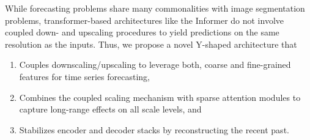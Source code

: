 While forecasting problems share many commonalities with image segmentation
problems, transformer-based architectures like the Informer do not
involve coupled down- and upscaling procedures to yield predictions
on the same resolution as the inputs. 
Thus, we propose a novel Y-shaped architecture that
\begin{enumerate}
\item Couples downscaling/upscaling to leverage both, coarse and fine-grained
       features for time series forecasting,
\item Combines the coupled scaling mechanism with sparse attention modules to capture long-range effects on all scale levels, and
\item Stabilizes encoder and decoder stacks by reconstructing the recent past.
\end{enumerate}



